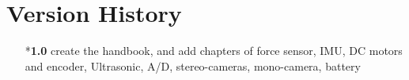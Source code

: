 \chapter*{Version History}

\begin{enumerate}
    \item[*\textbf{1.0}] create the handbook, and add chapters of 
    force sensor, IMU, DC motors and encoder, Ultrasonic, A/D, stereo-cameras, mono-camera, battery
\end{enumerate}


\begin{flushright}
	\date{\today}
\end{flushright}